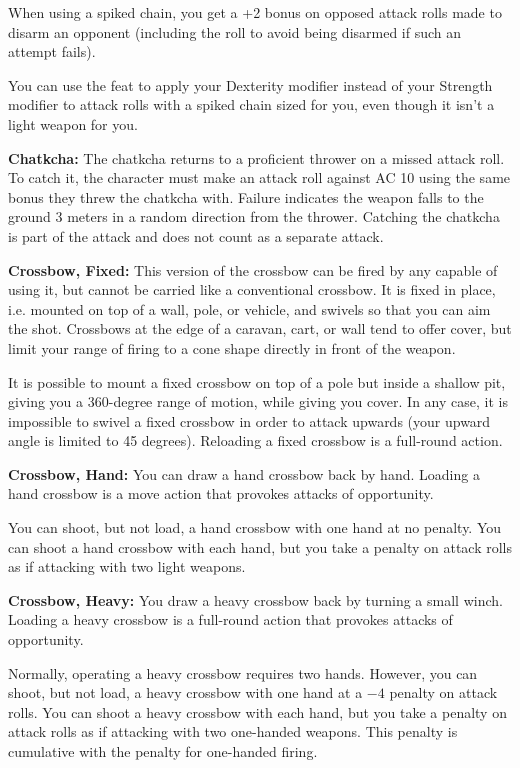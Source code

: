 When using a spiked chain, you get a +2 bonus on opposed attack rolls made to disarm an opponent (including the roll to avoid being disarmed if such an attempt fails).

You can use the  feat to apply your Dexterity modifier instead of your Strength modifier to attack rolls with a spiked chain sized for you, even though it isn't a light weapon for you. 

\textbf{Chatkcha:} The chatkcha returns to a proficient thrower on a missed attack roll. To catch it, the character must make an attack roll against AC 10 using the same bonus they threw the chatkcha with. Failure indicates the weapon falls to the ground 3 meters in a random direction from the thrower. Catching the chatkcha is part of the attack and does not count as a separate attack.

\textbf{Crossbow, Fixed:} This version of the crossbow can be fired by any capable of using it, but cannot be carried like a conventional crossbow. It is fixed in place, i.e. mounted on top of a wall, pole, or vehicle, and swivels so that you can aim the shot. Crossbows at the edge of a caravan, cart, or wall tend to offer cover, but limit your range of firing to a cone shape directly in front of the weapon.

It is possible to mount a fixed crossbow on top of a pole but inside a shallow pit, giving you a 360-degree range of motion, while giving you cover. In any case, it is impossible to swivel a fixed crossbow in order to attack upwards (your upward angle is limited to 45 degrees). Reloading a fixed crossbow is a full-round action.

\textbf{Crossbow, Hand:} You can draw a hand crossbow back by hand. Loading a hand crossbow is a move action that provokes attacks of opportunity.

You can shoot, but not load, a hand crossbow with one hand at no penalty. You can shoot a hand crossbow with each hand, but you take a penalty on attack rolls as if attacking with two light weapons. 

\textbf{Crossbow, Heavy:} You draw a heavy crossbow back by turning a small winch. Loading a heavy crossbow is a full-round action that provokes attacks of opportunity.

Normally, operating a heavy crossbow requires two hands. However, you can shoot, but not load, a heavy crossbow with one hand at a $-4$ penalty on attack rolls. You can shoot a heavy crossbow with each hand, but you take a penalty on attack rolls as if attacking with two one-handed weapons. This penalty is cumulative with the penalty for one-handed firing. 

